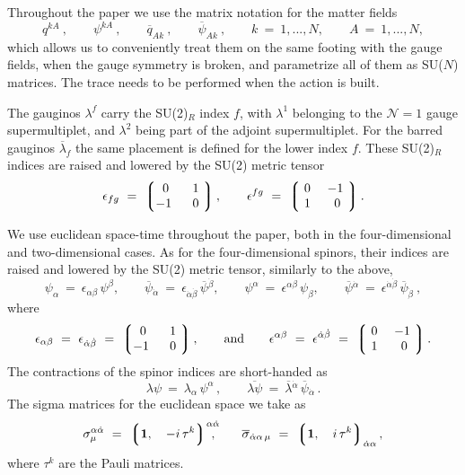 \documentclass[12pt]{article}
\newcommand{\none}{${\mathcal N}=1$ }
\newcommand{\ov}{\overline}
\newcommand{\lgr}{\left\lgroup}
\newcommand{\rgr}{\right\rgroup}
\begin{document}
\setcounter{equation}{0}

Throughout the paper we use the matrix notation for the matter fields
\[
	q^{kA}~, \qquad \psi^{kA}~,\qquad \ov{q}_{Ak}~, \qquad \ov{\psi}_{Ak}~,
	\qquad k~=~1,...,N, \qquad A~=~1,...,N,
\]
which allows us to conveniently treat them on the same footing with the gauge fields, when the gauge
symmetry is broken, and parametrize all of them as SU($N$) matrices. 
The trace needs to be performed when the action is built.

The gauginos $ \lambda^f $ carry the SU(2)$_R$ index $ f $, with $ \lambda^1 $ belonging
to the \none gauge supermultiplet, and $ \lambda^2 $ being part of the adjoint supermultiplet. 
For the barred gauginos $ \ov{\lambda}_f $ the same placement is defined for the lower
index $ f $.
These SU(2)$_R$ indices are raised and lowered by the SU(2) metric tensor
\[
	\epsilon_{fg} ~=~ 
			\lgr \begin{matrix}
			     	\ 0\  &  \ 1\   \\
				 -1\  &  \ 0\  
			     \end{matrix} \rgr,
	\qquad 
	\epsilon^{fg} ~=~ 
			\lgr \begin{matrix}
				\ 0\ &   -1\   \\
				\ 1\ &  \ 0\ 
			     \end{matrix} \rgr.
\]

We use euclidean space-time throughout the paper, both in the four-dimensional and two-dimensional
cases.
As for the four-dimensional spinors, their indices are raised and lowered by the SU(2) metric tensor,
similarly to the above,
\[
	\psi_\alpha ~=~ \epsilon_{\alpha\beta}\, \psi^\beta, \qquad
	\ov{\psi}{}_{\dot{\alpha}} ~=~ \epsilon_{\dot{\alpha}\dot{\beta}}\, \ov{\psi}{}^{\dot\beta}, \qquad 
	\psi^\alpha ~=~ \epsilon^{\alpha\beta}\, \psi_\beta, \qquad
	\ov{\psi}{}^{\dot{\alpha}} ~=~ \epsilon^{\dot\alpha\dot\beta}\, \ov{\psi}{}_{\dot\beta}~,
\]
	where
\[
	\epsilon_{\alpha\beta} ~=~ \epsilon_{\dot\alpha\dot\beta} ~=~
			\lgr \begin{matrix}
			     	\ 0\  &  \ 1\   \\
				 -1\  &  \ 0\  
			     \end{matrix} \rgr,
	\qquad \text{and} \qquad
	\epsilon^{\alpha\beta} ~=~ \epsilon^{\dot\alpha\dot\beta} ~=~
			\lgr \begin{matrix}
				\ 0\ &   -1\   \\
				\ 1\ &  \ 0\ 
			     \end{matrix} \rgr.
\]
The contractions of the spinor indices are short-handed as
\[
	\lambda\psi ~=~ \lambda_\alpha\, \psi^\alpha\,, \qquad
	\ov{\lambda\psi} ~=~  \ov{\lambda}{}^{\dot\alpha}\, \ov{\psi}{}_{\dot\alpha}\,.
\]
The sigma matrices for the euclidean space we take as
\[
	\sigma^{\alpha\dot\alpha}_\mu ~=~  \lgr {\bf 1},\quad -i\,\tau^k \rgr^{\alpha\dot{\alpha}}
	\hspace{-2.0ex},
	\qquad
	\ov{\sigma}{}_{\dot\alpha\alpha\, \mu} ~=~ 
			\lgr {\bf 1},\quad i\, \tau^k \rgr_{\dot\alpha\alpha},
\]
where $ \tau^k $ are the Pauli matrices.
\end{document}
